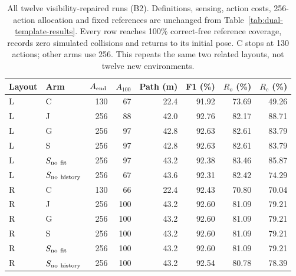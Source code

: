\begin{table}[!htbp]
\centering\small\setlength{\tabcolsep}{4pt}
\caption{All twelve visibility-repaired runs (B2). Definitions, sensing, action costs, 256-action allocation and fixed references are unchanged from Table~\ref{tab:dual-template-results}. Every row reaches 100\% correct-free reference coverage, records zero simulated collisions and returns to its initial pose. C stops at 130 actions; other arms use 256. This repeats the same two related layouts, not twelve new environments.}
\label{tab:visibility-repair-results}
\begin{tabular}{llrrrrrr}
\toprule
Layout & Arm & $A_{\rm end}$ & $A_{100}$ & Path (m) & F1 (\%) & $R_o$ (\%) & $R_c$ (\%) \\
\midrule
L & C & 130 & 67 & 22.4 & 91.92 & 73.69 & 49.26 \\
L & J & 256 & 88 & 42.0 & 92.76 & 82.17 & 88.71 \\
L & G & 256 & 97 & 42.8 & 92.63 & 82.61 & 83.79 \\
L & S & 256 & 97 & 42.8 & 92.63 & 82.61 & 83.79 \\
L & $S_{\rm no\ fit}$ & 256 & 97 & 43.2 & 92.38 & 83.46 & 85.87 \\
L & $S_{\rm no\ history}$ & 256 & 67 & 43.6 & 92.31 & 82.42 & 74.29 \\
\midrule
R & C & 130 & 66 & 22.4 & 92.43 & 70.80 & 70.04 \\
R & J & 256 & 100 & 43.2 & 92.60 & 81.09 & 79.21 \\
R & G & 256 & 100 & 43.2 & 92.60 & 81.09 & 79.21 \\
R & S & 256 & 100 & 43.2 & 92.60 & 81.09 & 79.21 \\
R & $S_{\rm no\ fit}$ & 256 & 100 & 43.2 & 92.60 & 81.09 & 79.21 \\
R & $S_{\rm no\ history}$ & 256 & 100 & 43.2 & 92.54 & 80.78 & 78.39 \\
\bottomrule
\end{tabular}
\end{table}
